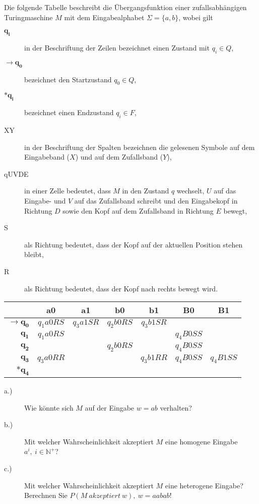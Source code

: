 Die folgende Tabelle beschreibt die Übergangsfunktion einer zufallsabhängigen Turingmaschine $M$ mit dem Eingabealphabet $\Sigma = \{a, b\}$, wobei gilt
\begin{description}
	\item [$\boldsymbol{q_i}$] in der Beschriftung der Zeilen bezeichnet einen Zustand mit $q_i \in Q$,
	\item [$\boldsymbol{\rightarrow q_0}$] bezeichnet den Startzustand $q_0 \in Q$,
	\item [$*\boldsymbol{q_i}$] bezeichnet einen Endzustand $q_i \in F$,
	\item [XY] in der Beschriftung der Spalten bezeichnen die gelesenen Symbole auf dem Eingabeband ($X$) und auf dem Zufallsband ($Y$),
	\item [qUVDE] in einer Zelle bedeutet, dass $M$ in den Zustand $q$ wechselt, $U$ auf das Eingabe- und $V$ auf das Zufallsband schreibt und den Eingabekopf in Richtung $D$ sowie den Kopf auf dem Zufallsband in Richtung $E$ bewegt,
	\item [S] als Richtung bedeutet, dass der Kopf auf der aktuellen Position stehen bleibt,
	\item [R] als Richtung bedeutet, dass der Kopf nach rechts bewegt wird.
\end{description}

\bgroup
	\def\arraystretch{1.5}
	\begin{tabular}{r || c | c | c | c | c | c}
		& \textbf{a0} & \textbf{a1} & \textbf{b0} & \textbf{b1} & \textbf{B0} & \textbf{B1} \\
		\hline \hline
		$\boldsymbol{\rightarrow q_0}$ & $q_1a0RS$ & $q_3a1SR$ & $q_2b0RS$ & $q_3b1SR$ & & \\
		\hline
		$\boldsymbol{q_1}$ & $q_1a0RS$ & & & & $q_4B0SS$ & \\
		\hline
		$\boldsymbol{q_2}$ & & & $q_2b0RS$ & & $q_4B0SS$ & \\
		\hline
		$\boldsymbol{q_3}$ & $q_3a0RR$ & & & $q_3b1RR$ & $q_4B0SS$ & $q_4B1SS$ \\
		\hline
		$\boldsymbol{*q_4}$ & & & & & & \\
	\end{tabular}
\egroup

\begin{description}
	\item [a.)] Wie könnte sich $M$ auf der Eingabe $w = ab$ verhalten?
	\item [b.)] Mit welcher Wahrscheinlichkeit akzeptiert $M$ eine homogene Eingabe $a^i,\ i \in \mathbb{N}^+$?
	\item [c.)] Mit welcher Wahrscheinlichkeit akzeptiert $M$ eine heterogene Eingabe? Berechnen Sie $P(M\ akzeptiert\ w),\ w = aabab$! 
\end{description}